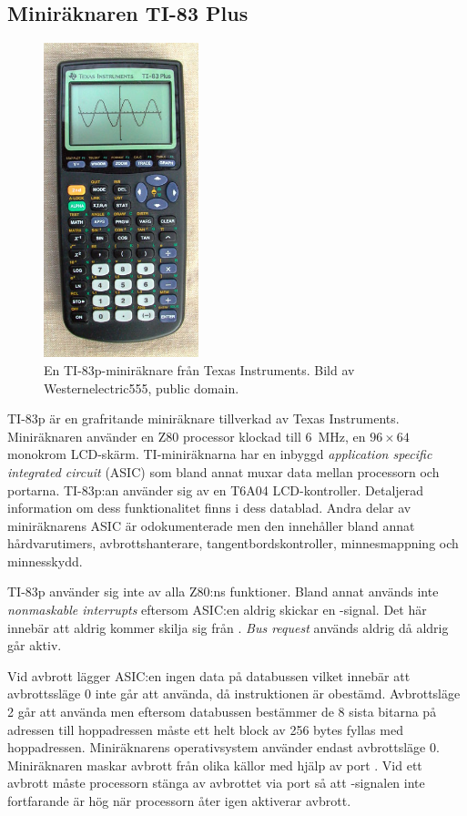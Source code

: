 \documentclass[main.tex]{subfiles}
\begin{document}
\subsection{Miniräknaren TI-83 Plus}
\begin{figure}
    \centering
    \includegraphics[width=0.4\textwidth, bb=0 0 284 578]{img/ti83p.jpg}
    \caption{En TI-83p-miniräknare från Texas Instruments. Bild av
    Westernelectric555, public domain.}
    \label{fig:ti83p}
\end{figure}
TI-83p är en grafritande miniräknare tillverkad av Texas Instruments.
Miniräknaren använder en Z80 processor klockad till \SI{6}{\mega\hertz}, en
$96\times64$ monokrom LCD-skärm. TI-miniräknarna har en inbyggd {\it
application specific integrated circuit} (ASIC) som bland annat muxar data
mellan processorn och portarna. TI-83p:an använder sig av en T6A04
LCD-kontroller. Detaljerad information om dess funktionalitet finns i dess
datablad\cite{t6a04}. Andra delar av miniräknarens ASIC är odokumenterade men
den innehåller bland annat hårdvarutimers, avbrottshanterare,
tangentbordskontroller, minnesmappning och minnesskydd.

TI-83p använder sig inte av alla Z80:ns funktioner. Bland annat används inte
{\it nonmaskable interrupts} eftersom ASIC:en aldrig skickar en
-signal. Det här innebär att  aldrig kommer skilja sig
från .  {\it Bus request} används aldrig då  aldrig går
aktiv.

Vid avbrott lägger ASIC:en ingen data på databussen vilket innebär att
avbrottssläge 0 inte går att använda, då instruktionen är obestämd.
Avbrottsläge 2 går att använda men eftersom databussen bestämmer de 8 sista
bitarna på adressen till hoppadressen måste ett helt block av 256 bytes fyllas
med hoppadressen. Miniräknarens operativsystem använder endast avbrottsläge 0.
Miniräknaren maskar avbrott från olika källor med hjälp av port . Vid
ett avbrott måste processorn stänga av avbrottet via port  så att
-signalen inte fortfarande är hög när processorn åter igen aktiverar
avbrott.
\end{document}
